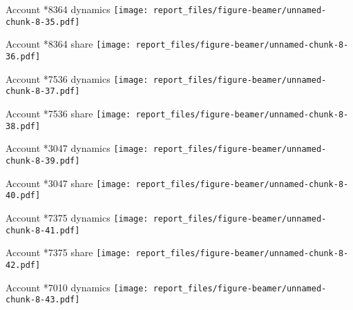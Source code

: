 \documentclass[ignorenonframetext,]{beamer}
\begin{document}
\begin{frame}{Account *8364 dynamics
\texttt{[image: report\_files/figure-beamer/unnamed-chunk-8-35.pdf]}}
\protect\hypertarget{account-8364-dynamics}{}

\end{frame}

\begin{frame}{Account *8364 share
\texttt{[image: report\_files/figure-beamer/unnamed-chunk-8-36.pdf]}}
\protect\hypertarget{account-8364-share}{}

\end{frame}

\begin{frame}{Account *7536 dynamics
\texttt{[image: report\_files/figure-beamer/unnamed-chunk-8-37.pdf]}}
\protect\hypertarget{account-7536-dynamics}{}

\end{frame}

\begin{frame}{Account *7536 share
\texttt{[image: report\_files/figure-beamer/unnamed-chunk-8-38.pdf]}}
\protect\hypertarget{account-7536-share}{}

\end{frame}

\begin{frame}{Account *3047 dynamics
\texttt{[image: report\_files/figure-beamer/unnamed-chunk-8-39.pdf]}}
\protect\hypertarget{account-3047-dynamics}{}

\end{frame}

\begin{frame}{Account *3047 share
\texttt{[image: report\_files/figure-beamer/unnamed-chunk-8-40.pdf]}}
\protect\hypertarget{account-3047-share}{}

\end{frame}

\begin{frame}{Account *7375 dynamics
\texttt{[image: report\_files/figure-beamer/unnamed-chunk-8-41.pdf]}}
\protect\hypertarget{account-7375-dynamics}{}

\end{frame}

\begin{frame}{Account *7375 share
\texttt{[image: report\_files/figure-beamer/unnamed-chunk-8-42.pdf]}}
\protect\hypertarget{account-7375-share}{}

\end{frame}

\begin{frame}{Account *7010 dynamics
\texttt{[image: report\_files/figure-beamer/unnamed-chunk-8-43.pdf]}}
\protect\hypertarget{account-7010-dynamics}{}

\end{frame}
\end{document}
